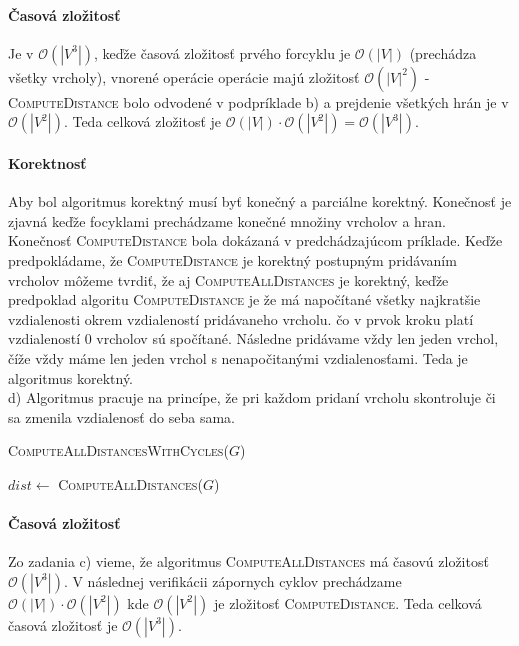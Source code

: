 \documentclass[12pt]{iv003}
\begin{document}
\paragraph{Časová zložitosť} Je v $\mathcal{O}(|V^{3}|)$, keďže časová zložitosť prvého forcyklu je $\mathcal{O}(|V|)$ (prechádza všetky vrcholy), vnorené operácie operácie majú zložitosť $\mathcal{O}(|V|^{2})$ - \textsc{ComputeDistance} bolo odvodené v podpríklade b) a prejdenie všetkých hrán je v $\mathcal{O}(|V^{2}|)$. Teda celková zložitosť je $\mathcal{O}(|V|) \cdot \mathcal{O}(|V^{2}|) = \mathcal{O}(|V^{3}|)$.\\

\paragraph{Korektnosť} Aby bol algoritmus korektný musí byť konečný a parciálne korektný. Konečnosť je zjavná keďže focyklami prechádzame konečné množiny vrcholov a hran. Konečnosť \textsc{ComputeDistance} bola dokázaná v predchádzajúcom príklade. Keďže predpokládame, že \textsc{ComputeDistance} je korektný postupným pridávaním vrcholov môžeme tvrdiť, že aj \textsc{ComputeAllDistances} je korektný, keďže predpoklad algoritu \textsc{ComputeDistance} je že má napočítané všetky najkratšie vzdialenosti okrem vzdialeností pridávaneho vrcholu. čo v prvok kroku platí vzdialeností 0 vrcholov sú spočítané. Následne pridávame vždy len jeden vrchol, číže vždy máme len jeden vrchol s nenapočitanými vzdialenosťami. Teda je algoritmus korektný.\\

d) Algoritmus pracuje na princípe, že pri každom pridaní vrcholu skontroluje či sa zmenila vzdialenosť do seba sama.

\begin{algorithm}[H]
	\caption{\textsc{ComputeAllDistancesWithCycles}($G$)}
	$dist \leftarrow$ \textsc{ComputeAllDistances}($G$)\;
\end{algorithm}

\paragraph{Časová zložitosť} Zo zadania c) vieme, že algoritmus \textsc{ComputeAllDistances} má časovú zložitosť $\mathcal{O}(|V^{3}|)$. V následnej verifikácii zápornych cyklov prechádzame  $\mathcal{O}(|V|) \cdot \mathcal{O}(|V^{2}|)$ kde $\mathcal{O}(|V^{2}|)$ je zložitosť \textsc{ComputeDistance}. Teda celková časová zložitosť je $\mathcal{O}(|V^{3}|)$.
\end{document}
